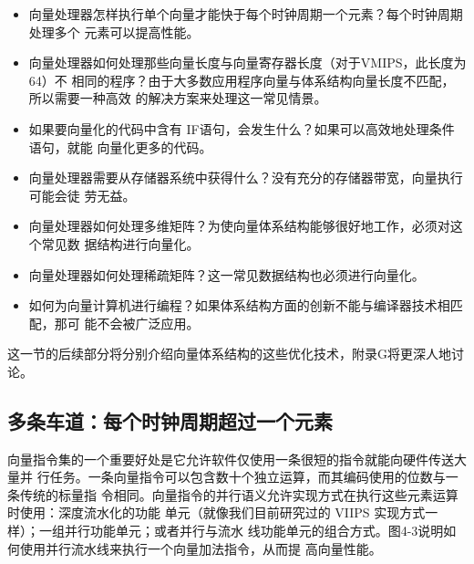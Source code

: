 \begin{itemize}
    \item 向量处理器怎样执行单个向量才能快于每个时钟周期一个元素？每个时钟周期处理多个
    元素可以提高性能。
    \item 向量处理器如何处理那些向量长度与向量寄存器长度（对于VMIPS，此长度为64）不
    相同的程序？由于大多数应用程序向量与体系结构向量长度不匹配，所以需要一种高效
    的解决方案来处理这一常见情景。
    \item 如果要向量化的代码中含有 IF语句，会发生什么？如果可以高效地处理条件语句，就能
    向量化更多的代码。
    \item 向量处理器需要从存储器系统中获得什么？没有充分的存储器带宽，向量执行可能会徒
    劳无益。
    \item 向量处理器如何处理多维矩阵？为使向量体系结构能够很好地工作，必须对这个常见数
    据结构进行向量化。
    \item 向量处理器如何处理稀疏矩阵？这一常见数据结构也必须进行向量化。
    \item 如何为向量计算机进行编程？如果体系结构方面的创新不能与编译器技术相匹配，那可
    能不会被广泛应用。
\end{itemize}

这一节的后续部分将分别介绍向量体系结构的这些优化技术，附录G将更深人地讨论。

\subsection{多条车道：每个时钟周期超过一个元素}

向量指令集的一个重要好处是它允许软件仅使用一条很短的指令就能向硬件传送大量并
行任务。一条向量指令可以包含数十个独立运算，而其编码使用的位数与一条传统的标量指
令相同。向量指令的并行语义允许实现方式在执行这些元素运算时使用：深度流水化的功能
单元（就像我们目前研究过的 VIIPS 实现方式一样）；一组并行功能单元；或者并行与流水
线功能单元的组合方式。图4-3说明如何使用并行流水线来执行一个向量加法指令，从而提
高向量性能。


